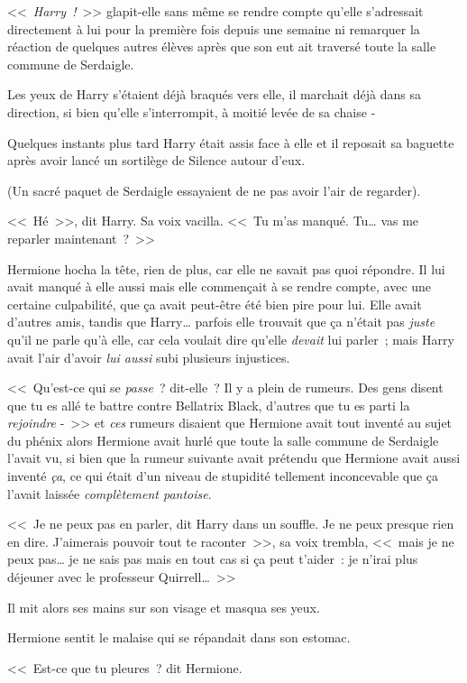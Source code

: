<<~\emph{Harry~!}~>> glapit-elle sans même se rendre compte qu'elle s'adressait directement à lui pour la première fois depuis une semaine ni remarquer la réaction de quelques autres élèves après que son eut ait traversé toute la salle commune de Serdaigle.

Les yeux de Harry s'étaient déjà braqués vers elle, il marchait déjà dans sa direction, si bien qu'elle s'interrompit, à moitié levée de sa chaise -

Quelques instants plus tard Harry était assis face à elle et il reposait sa baguette après avoir lancé un sortilège de Silence autour d'eux.

(Un sacré paquet de Serdaigle essayaient de ne pas avoir l'air de regarder).

<<~Hé~>>, dit Harry. Sa voix vacilla. <<~Tu m'as manqué. Tu… vas me reparler maintenant~?~>>

Hermione hocha la tête, rien de plus, car elle ne savait pas quoi répondre. Il lui avait manqué à elle aussi mais elle commençait à se rendre compte, avec une certaine culpabilité, que ça avait peut-être été bien pire pour lui. Elle avait d'autres amis, tandis que Harry… parfois elle trouvait que ça n'était pas \emph{juste} qu'il ne parle qu'à elle, car cela voulait dire qu'elle \emph{devait} lui parler~; mais Harry avait l'air d'avoir \emph{lui aussi} subi plusieurs injustices.

<<~Qu'est-ce qui se \emph{passe}~? dit-elle~? Il y a plein de rumeurs. Des gens disent que tu es allé te battre contre Bellatrix Black, d'autres que tu es parti la \emph{rejoindre} -~>> et \emph{ces} rumeurs disaient que Hermione avait tout inventé au sujet du phénix alors Hermione avait hurlé que toute la salle commune de Serdaigle l'avait vu, si bien que la rumeur suivante avait prétendu que Hermione avait aussi inventé \emph{ça}, ce qui était d'un niveau de stupidité tellement inconcevable que ça l'avait laissée \emph{complètement pantoise}.

<<~Je ne peux pas en parler, dit Harry dans un souffle. Je ne peux presque rien en dire. J'aimerais pouvoir tout te raconter~>>, sa voix trembla, <<~mais je ne peux pas… je ne sais pas mais en tout cas si ça peut t'aider~: je n'irai plus déjeuner avec le professeur Quirrell…~>>

Il mit alors ses mains sur son visage et masqua ses yeux.

Hermione sentit le malaise qui se répandait dans son estomac.

<<~Est-ce que tu pleures~? dit Hermione.

